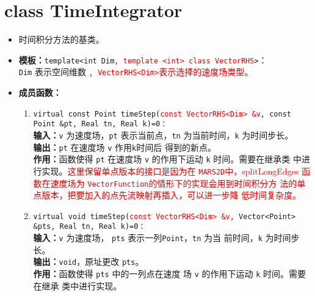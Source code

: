 \documentclass[a4paper,twoside]{ctexart}
\begin{document}
\section{class TimeIntegrator}
\begin{itemize}
    \item 时间积分方法的基类。
    \item \textbf{模板：}\texttt{template<int
        Dim}\textcolor{red}{\texttt{, template <int> class
          VectorRHS}}\texttt{>}：\\\texttt{Dim} 表示空间维数
      \textcolor{red}{\texttt{, VectorRHS<Dim>}表示选择的速度场类型。}
    \item \textbf{成员函数：}
      \begin{enumerate}[(1)]
        \item 
           \texttt{virtual const Point timeStep(}\textcolor{red}{\texttt{const VectorRHS<Dim> \&v}}\texttt{,
            const Point \&pt, Real tn, Real k)=0：}\\
          \textbf{输入：}\texttt{v} 为速度场，\texttt{pt} 表示当前点，\texttt{tn} 为当前时间，\texttt{k} 为时间步长。\\
                \textbf{输出：}\texttt{pt} 在速度场 \texttt{v} 作用\texttt{k}时间后
                得到的新点。\\
                \textbf{作用：}函数使得 \texttt{pt} 在速度场
                \texttt{v} 的作用下运动 \texttt{k} 时间。需要在继承类
                中进行实现。\textcolor{red}{这里保留单点版本的接口是因为在
                \texttt{MARS2D}中，splitLongEdges 函数在速度场为
                \texttt{VectorFunction}的情形下的实现会用到时间积分方
                法的单点版本，把要加入的点先流映射再插入，可以进一步降
                低时间复杂度。}
                \item \texttt{virtual void
                    timeStep(}\textcolor{red}{\texttt{const VectorRHS<Dim> \&v}}\texttt{, Vector<Point> \&pts, Real tn, Real k)=0：}\\
                \textbf{输入：}\texttt{v} 为速度场，
                \texttt{pts} 表示一列\texttt{Point}，\texttt{tn} 为当
                前时间，\texttt{k} 为时间步长。\\
                \textbf{输出：}\texttt{void}，原址更改 \texttt{pts}。\\
                \textbf{作用：}函数使得 \texttt{pts} 中的一列点在速度
                场 \texttt{v} 的作用下运动 \texttt{k} 时间。需要在继承
                类中进行实现。
            \end{enumerate}
\end{itemize}
\end{document}
